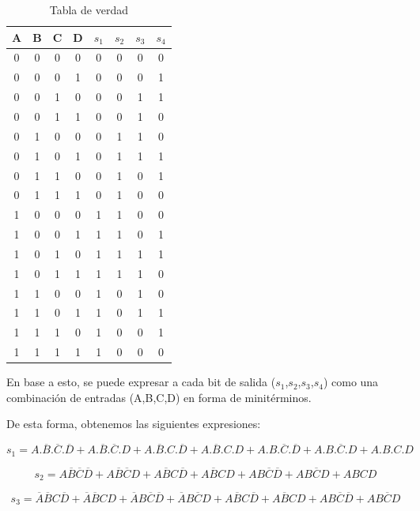 \begin{table}[h!]\caption{Tabla de verdad}
\centering
\begin{tabular}{cccc|cccc}
A & B & C & D & $s_{1}$ & $s_{2}$ & $s_{3}$ & $s_{4}$ \\ \hline
0 & 0 & 0 & 0 & 0  & 0  & 0  & 0  \\
0 & 0 & 0 & 1 & 0  & 0  & 0  & 1  \\
0 & 0 & 1 & 0 & 0  & 0  & 1  & 1  \\
0 & 0 & 1 & 1 & 0  & 0  & 1  & 0  \\
0 & 1 & 0 & 0 & 0  & 1  & 1  & 0  \\
0 & 1 & 0 & 1 & 0  & 1  & 1  & 1  \\
0 & 1 & 1 & 0 & 0  & 1  & 0  & 1  \\
0 & 1 & 1 & 1 & 0  & 1  & 0  & 0  \\
1 & 0 & 0 & 0 & 1  & 1  & 0  & 0  \\
1 & 0 & 0 & 1 & 1  & 1  & 0  & 1  \\
1 & 0 & 1 & 0 & 1  & 1  & 1  & 1  \\
1 & 0 & 1 & 1 & 1  & 1  & 1  & 0  \\
1 & 1 & 0 & 0 & 1  & 0  & 1  & 0  \\
1 & 1 & 0 & 1 & 1  & 0  & 1  & 1  \\
1 & 1 & 1 & 0 & 1  & 0  & 0  & 1  \\
1 & 1 & 1 & 1 & 1  & 0  & 0  & 0 
\end{tabular}
\end{table}

En base a esto, se puede expresar a cada bit de salida ($s_{1}$,$s_{2}$,$s_{3}$,$s_{4}$) como una combinación de entradas (A,B,C,D) en forma de minitérminos.

De esta forma, obtenemos las siguientes expresiones:

\begin{equation}\label{s1_mini}
    s_{1} = A.\overline{B}.\overline{C}.\overline{D} +A.\overline{B}.\overline{C}.D+A.\overline{B}.C.\overline{D}+A.\overline{B}.C.D+A.B.\overline{C}.\overline{D}+A.B.\overline{C}.D+A.B.C.D
\end{equation}

\begin{equation}\label{s2_mini}
    s_{2} = A\overline{B}\overline{C}\overline{D} +A\overline{B}\overline{C}D+A\overline{B}C\overline{D}+A\overline{B}CD+AB\overline{C}\overline{D}+AB\overline{C}D+ABCD
\end{equation}

\begin{equation}\label{s3_mini}
    s_{3} = \overline{A}\overline{B}C\overline{D}+\overline{A}\overline{B}CD+\overline{A}B\overline{C}\overline{D}+\overline{A}B\overline{C}D+A\overline{B}C\overline{D}+A\overline{B}CD+AB\overline{C}\overline{D}+AB\overline{C}D
\end{equation}

